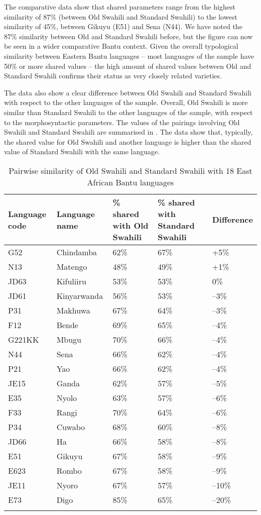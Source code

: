 \documentclass[output=paper]{langscibook}
\begin{document}
 \newpage
The comparative data show that shared parameters range from the highest similarity of 87\% (between Old Swahili and Standard Swahili) to the lowest similarity of 45\%, between Gikuyu (E51) and Sena (N44). We have noted the 87\% similarity between Old and Standard Swahili before, but the figure can now be seen in a wider comparative Bantu context. Given the overall typological similarity between Eastern Bantu languages -- most languages of the sample have 50\% or more shared values -- the high amount of shared values between Old and Standard Swahili confirms their status as very closely related varieties. 

The data also show a clear difference between Old Swahili and Standard Swahili with respect to the other languages of the sample. Overall, Old Swahili is more similar than Standard Swahili to the other languages of the sample, with respect to the morphosyntactic parameters. The values of the pairings involving Old Swahili and Standard Swahili are summarised in . The data show that, typically, the shared value for Old Swahili and another language is higher than the shared value of Standard Swahili with the same language. 


\begin{table}
\begin{tabularx}{\textwidth}{p{}p{}YYY}

\lsptoprule

Language code & Language name & \% shared with Old Swahili & \% shared with Standard Swahili & Difference\\
\midrule
G52 & Chindamba & 62\% & 67\% & +5\%\\
N13 & Matengo & 48\% & 49\% & +1\%\\
JD63 & Kifuliiru & 53\% & 53\% & 0\%\\
JD61 & Kinyarwanda & 56\% & 53\% & $–$3\%\\
P31 & Makhuwa & 67\% & 64\% & $–$3\%\\
F12 & Bende & 69\% & 65\% & $–$4\%\\
G221KK & Mbugu & 70\% & 66\% & $–$4\%\\
N44 & Sena & 66\% & 62\% & $–$4\%\\
P21 & Yao & 66\% & 62\% & $–$4\%\\
JE15 & Ganda & 62\% & 57\% & $–$5\%\\
E35 & Nyolo & 63\% & 57\% & $–$6\%\\
F33 & Rangi & 70\% & 64\% & $–$6\%\\
P34 & Cuwabo & 68\% & 60\% & $–$8\%\\
JD66 & Ha & 66\% & 58\% & $–$8\%\\
E51 & Gikuyu & 67\% & 58\% & $–$9\%\\
E623 & Rombo & 67\% & 58\% & $–$9\%\\
JE11 & Nyoro & 67\% & 57\% & $–$10\%\\
E73 & Digo & 85\% & 65\% & $–$20\%\\
\lspbottomrule
\end{tabularx}
\caption{\label{tab:marten:8} Pairwise similarity of Old Swahili and Standard Swahili with 18 East African Bantu languages}
\end{table}
\end{document}
